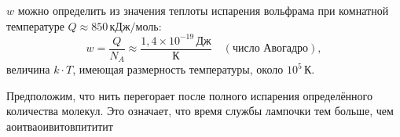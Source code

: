 \documentclass[12pt, a4pape]{article}
\begin{document}
\begin{multicols}{2}
         $w$ можно определить из значения теплоты испарения вольфрама при комнатной температуре $Q \approx 850 \, \text{кДж/моль}$:
        \[ w = \frac{Q}{N_A} \approx \frac{1,4 \times 10^{-19} \, \text{Дж}}{\text{К}} \quad (\text{число Авогадро}),\]
        величина $k \cdot T$, имеющая размерность температуры, около $10^5 \, \text{К}$.
        
        Предположим, что нить перегорает после полного испарения определённого количества молекул. Это означает, что время службы лампочки тем больше, чем
        аоитваоивитовпититит
    \end{multicols} 
\end{document}
